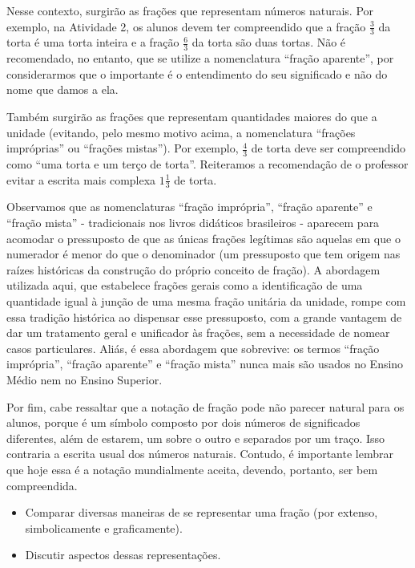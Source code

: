 Nesse contexto, surgirão as frações que representam números naturais. Por exemplo, na Atividade 2, os alunos devem ter compreendido que a fração $\frac{3}{3}$ da torta é uma torta inteira e a fração $\frac{6}{3}$ da torta são duas tortas. Não é recomendado, no entanto, que se utilize a nomenclatura ``fração aparente'', por considerarmos que o importante é o entendimento do seu significado e não do nome que damos a ela.

Também surgirão as frações que representam quantidades maiores do que a unidade (evitando, pelo mesmo motivo acima, a nomenclatura ``frações impróprias'' ou ``frações mistas''). Por exemplo, $\frac{4}{3}$ de torta deve ser compreendido como ``uma torta e um terço de torta''. Reiteramos a recomendação de o professor evitar a escrita mais complexa $1 \frac{1}{3}$ de torta.

Observamos que as nomenclaturas ``fração imprópria'', ``fração aparente'' e ``fração mista'' - tradicionais nos livros didáticos brasileiros - aparecem para acomodar o pressuposto de que as únicas frações legítimas são aquelas em que o numerador é menor do que o denominador (um pressuposto que tem origem nas raízes históricas da construção do próprio conceito de fração).
A abordagem utilizada aqui, que estabelece frações gerais como a identificação de uma quantidade igual à junção de uma mesma fração unitária da unidade, rompe com essa tradição histórica ao dispensar esse pressuposto, com a grande vantagem de dar um tratamento geral e unificador às frações, sem a necessidade de nomear casos particulares.
Aliás, é essa abordagem que sobrevive: os termos ``fração imprópria'', ``fração aparente'' e ``fração mista'' nunca mais são usados no Ensino Médio nem no Ensino Superior.

Por fim, cabe ressaltar que a notação de fração pode não parecer natural para os alunos, porque é um símbolo composto por dois números de significados diferentes, além de estarem, um sobre o outro e separados por um traço. Isso contraria a escrita usual dos números naturais. Contudo, é importante lembrar que hoje essa é a notação mundialmente aceita, devendo, portanto, ser bem compreendida.

\Bg

\begin{objetivos}{}{}
  \begin{itemize} %
    \item       Comparar diversas maneiras de se representar uma fração (por extenso, simbolicamente e graficamente).
    \item       Discutir aspectos dessas representações.
\end{itemize} %

\end{objetivos}

